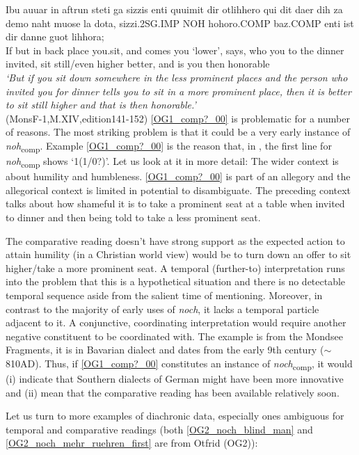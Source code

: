 \documentclass[output=paper,
modfonts
]{langscibook}
\begin{document}
\ea\gll Ibu auuar in aftrun steti {ga sizzis} enti quuimit dir otlihhero {qui dit} daer dih za demo {naht muose} {la dota,} sizzi.2SG.IMP NOH hohoro.COMP baz.COMP enti ist dir danne {guot lihhora;}\\
       If but in back place you.sit, and comes you `lower', says, who you to the dinner invited, sit still/even higher better, and is you then honorable\\
\glt   \textit{`But if you sit down somewhere in the less prominent places and the person who invited you for dinner tells you to sit in a more prominent place, then it is better to sit still higher and that is then honorable.'} \label{OG1_comp?_00} \\ \flushright \vspace{-24pt} (MonsF-1,M.XIV,edition141-152)
\z
\ref{OG1_comp?_00} is problematic for a number of reasons. The most striking problem is that it could be a very early instance of \textit{noh}\textsubscript{comp}. Example \ref{OG1_comp?_00} is the reason that, in , the first line for \textit{noh}\textsubscript{comp} shows `1(1/0?)'. Let us look at it in more detail: The wider context is about humility and humbleness. \ref{OG1_comp?_00} is part of an allegory and the allegorical context is limited in potential to disambiguate. The preceding context talks about how shameful it is to take a prominent seat at a table when invited to dinner and then being told to take a less prominent seat.

The comparative reading doesn't have strong support as the expected action to attain humility (in a Christian world view) would be to turn down an offer to sit higher/take a more prominent seat. A temporal (further-to) interpretation runs into the problem that this is a hypothetical situation and there is no detectable temporal sequence aside from the salient time of mentioning. Moreover, in contrast to the majority of early uses of \textit{noch}, it lacks a temporal particle adjacent to it. A conjunctive, coordinating interpretation would require another negative constituent to be coordinated with. The example is from the Mondsee Fragments, it is in Bavarian dialect and dates from the early 9th century ($\sim$ 810AD)\citep{annis_og}. Thus, if \ref{OG1_comp?_00} constitutes an instance of \textit{noch}\textsubscript{comp}, it would (i) indicate that Southern dialects of German might have been more innovative and (ii) mean that the comparative reading has been available relatively soon.

Let us turn to more examples of diachronic data, especially ones ambiguous for temporal and comparative readings (both \ref{OG2_noch_blind_man} and \ref{OG2_noch_mehr_ruehren_first} are from Otfrid (OG2)):
\end{document}
